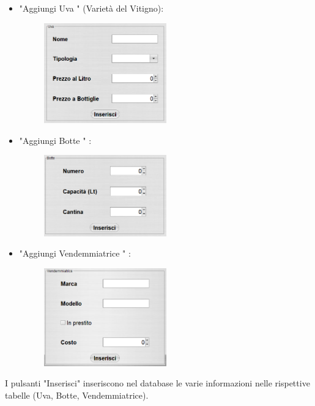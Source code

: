 \documentclass{article}
\begin{document}
\begin{itemize}
\item "Aggiungi Uva " (Varietà del Vitigno):\\
\begin{figure}[htbp]
\centering
\includegraphics[width=0.5\textwidth]{img/panel_uva.png}
\end{figure}
\newpage
\item "Aggiungi Botte " :\\
\begin{figure}[htbp]
\centering
\includegraphics[width=0.5\textwidth]{img/panel_botte.png}
\end{figure}
\item "Aggiungi Vendemmiatrice " :\\
\begin{figure}[htbp]
\centering
\includegraphics[width=0.5\textwidth]{img/panel_vendemmiatrice.png}
\end{figure}
\end{itemize}
I pulsanti "Inserisci" inseriscono nel database le varie informazioni nelle rispettive tabelle (Uva, Botte, Vendemmiatrice).\\
\newpage
\end{document}
